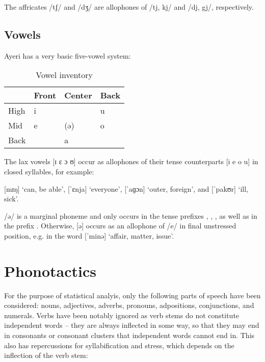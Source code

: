 The affricates /tʃ/ and /dʒ/ are allophones of /tj, kj/ and /dj, gj/, 
respectively.

\subsection{Vowels}

Ayeri has a very basic five-vowel system:

\begin{table}\centering
\label{tab:vowels}
\caption{Vowel inventory}
\begin{tabu} to .5\textwidth{H X[c] X[c] X[c]}
\toprule\tableheaderfont

	& Front
	& Center
	& Back
	\\

\toprule

High
	& i
	&
	& u
	\\

Mid
	& e
	& (ə)
	& o
	\\

Back
	&
	& a
	&
	\\

\bottomrule
\end{tabu}
\end{table}

The lax vowels [ɪ ɛ ɔ ʊ] occur as allophones of their tense counterparts 
[i e o u] in closed syllables, for example:

\pex
	\a {} [mɪŋ] `can, be able',
	\a {} [ˈɛnja] `everyone',
	\a {} [ˈaɡɔn] `outer, foreign', and
	\a {} [ˈpakʊr] `ill, sick'.
\xe

/ə/ is a marginal phoneme and only occurs in the 
tense prefixes , , 
{\RPst{}}, as well as in the prefix . 
Otherwise, [ə] occurs as an allophone of /e/ in final unstressed position, e.g. 
in the word  [ˈminə] `affair, matter, issue'.

\section{Phonotactics}

For the purpose of statistical analyis, only the following parts of speech have 
been considered: nouns, adjectives, adverbs, pronouns, adpositions, 
conjunctions, and numerals. Verbs have been notably ignored as verb stems do 
not constitute independent words -- they are always inflected in some way, so 
that they may end in consonants or consonant clusters that independent words 
cannot end in. This also has repercussions for syllabification and stress, 
which depends on the inflection of the verb stem:

